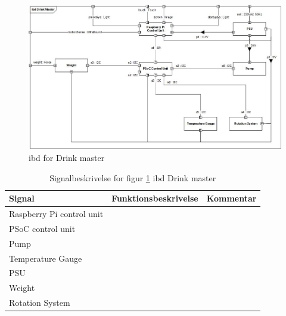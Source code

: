 \begin{figure}[h!]
	\centering
	\includegraphics[width=1\textwidth]{Images/IBD_System_JPEG.jpg}
	\caption{ibd for Drink master}
	\label{fig:ibd}
\end{figure}
\FloatBarrier

\begin{table}[H] 
	\centering 
	\caption{Signalbeskrivelse for figur \ref{fig:ibd} ibd Drink master}
	\begin{tabular}{|p{3cm}|p{7cm}|p{3cm}|}
		\hline
\textbf{Signal} & \textbf{Funktionsbeskrivelse}  &  \textbf{Kommentar}  \\ \hline
Raspberry Pi control unit   & &  \\ \hline
PSoC control unit    & &  \\ \hline
Pump              & &  \\ \hline
Temperature Gauge & &  \\ \hline
PSU               & &  \\ \hline 
Weight            & &  \\ \hline
Rotation System   & &  \\ \hline

	\end{tabular}
	\label{tab:signalbeskrivelse}
\end{table}
\FloatBarrier